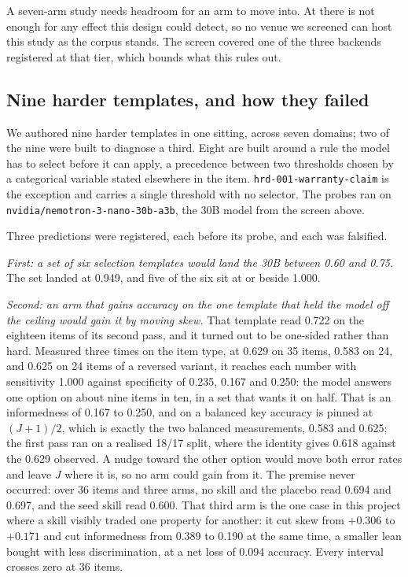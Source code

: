 A seven-arm study needs headroom for an arm to move into. At
\NUM{\screenWorst} there is not enough for any effect this design could
detect, so no venue we screened can host this study as the corpus stands. The
screen covered one of the three backends registered at that tier, which
bounds what this rules out.

\subsection{Nine harder templates, and how they failed}

We authored nine harder templates in one sitting, across seven domains; two
of the nine were built to diagnose a third.
Eight are built around a rule the model has to select before it can apply, a
precedence between two thresholds chosen by a categorical variable stated
elsewhere in the item. \texttt{hrd-001-warranty-claim} is the exception and
carries a single threshold with no selector. The probes ran on
\texttt{nvidia/nemotron-3-nano-30b-a3b}, the 30B model from the screen above.

Three predictions were registered, each before its probe, and each was
falsified.

\emph{First: a set of six selection templates would land the 30B between
0.60 and 0.75.} The set landed at 0.949, and five of the six sit at or
beside 1.000.

\emph{Second: an arm that gains accuracy on the one template that held the
model off the ceiling would gain it by moving skew.} That template read 0.722
on the eighteen items of its second pass, and it turned out to be one-sided
rather than hard. Measured three times on the item type, at 0.629 on 35
items, 0.583 on 24, and 0.625 on 24 items of a reversed variant, it reaches
each number with sensitivity 1.000 against specificity of 0.235, 0.167 and
0.250: the model answers one option on about nine items in ten, in a set that
wants it on half. That is an informedness of 0.167 to 0.250, and on a
balanced key accuracy is pinned at $(J+1)/2$, which is exactly the two
balanced measurements, 0.583 and 0.625; the first pass ran on a realised
18/17 split, where the identity gives 0.618 against the 0.629 observed. A
nudge toward the other option would move both error rates and leave $J$
where it is, so no arm could gain from it. The premise never occurred: over
36 items and three arms, no skill and the placebo read 0.694 and 0.697, and
the seed skill read 0.600. That third arm is the one case in this project
where a skill visibly traded one property for another: it cut skew from
$+0.306$ to $+0.171$ and cut informedness from 0.389 to 0.190 at the same
time, a smaller lean bought with less discrimination, at a net loss of 0.094
accuracy. Every interval crosses zero at 36 items.

